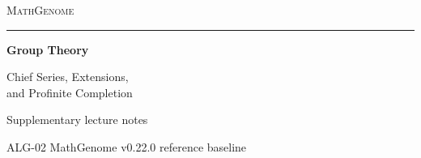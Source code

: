 \documentclass[11pt,oneside,openany]{book}
\theoremstyle{definition}
\theoremstyle{remark}
\begin{document}
\frontmatter
\hypersetup{pageanchor=false}
\begin{titlepage}
  \thispagestyle{empty}
  \begin{flushleft}
    \vspace*{0.65in}
    {\large\scshape\color{deepgreen}MathGenome\par}
    \vspace{0.32in}
    {\color{rulegreen}\rule{0.94\textwidth}{0.65pt}\par}
    \vspace{0.45in}
    {\color{ink}\fontsize{34}{39}\selectfont\bfseries
       Group Theory\par}
    \vspace{0.30in}
    {\color{deepgreen}\Large
       Chief Series, Extensions,\\[3pt] and Profinite Completion\par}
    \vfill
    {\large Supplementary lecture notes\par}
    \vspace{0.12in}
    {\normalsize ALG-02 \enspace\textperiodcentered\enspace MathGenome v0.22.0 reference baseline\par}
    \vspace*{0.48in}
  \end{flushleft}
\end{titlepage}
\hypersetup{pageanchor=true}
{\small\tableofcontents}


\mainmatter



\end{document}
